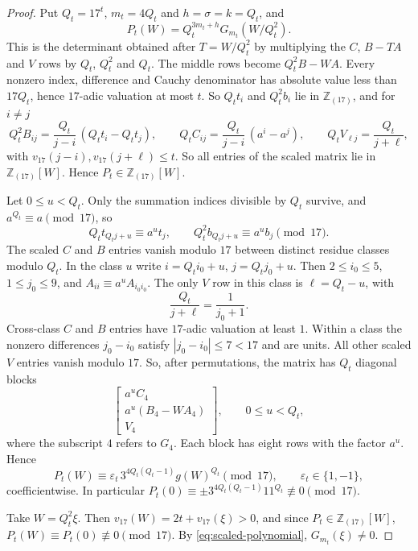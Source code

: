 \documentclass{amsart}
\numberwithin{equation}{section}
\numberwithin{table}{section}
\newcommand{\Z}{\mathbb{Z}}
\begin{document}
\begin{proof}
Put $Q_t=17^t$, $m_t=4Q_t$ and $h=\sigma=k=Q_t$, and
\begin{equation}\label{eq:scaled-polynomial}
P_t(W)=Q_t^{3m_t+h}G_{m_t}(W/Q_t^2).
\end{equation}
This is the determinant obtained after $T=W/Q_t^2$ by multiplying the $C$,
$B-TA$ and $V$ rows by $Q_t$, $Q_t^2$ and $Q_t$. The middle rows become
$Q_t^2B-WA$. Every nonzero index,
difference and Cauchy denominator has absolute value less than $17Q_t$,
hence $17$-adic valuation at most $t$. So $Q_tt_i$ and $Q_t^2b_i$ lie in
$\Z_{(17)}$, and for $i\ne j$
\[
 Q_t^2B_{ij}=\frac{Q_t}{j-i}\,(Q_tt_i-Q_tt_j),\qquad
 Q_tC_{ij}=\frac{Q_t}{j-i}\,(a^i-a^j),\qquad
 Q_tV_{\ell j}=\frac{Q_t}{j+\ell},
\]
with $v_{17}(j-i),v_{17}(j+\ell)\le t$. So all entries of the scaled matrix
lie in $\Z_{(17)}[W]$. Hence
$P_t\in\Z_{(17)}[W]$.

Let $0\le u<Q_t$. Only the summation indices divisible by $Q_t$
survive, and $a^{Q_t}\equiv a\pmod{17}$, so
\begin{equation*}
Q_t t_{Q_t j+u}\equiv a^ut_j,
\qquad Q_t^2b_{Q_t j+u}\equiv a^ub_j\pmod {17}.
\end{equation*}
The scaled $C$ and $B$ entries vanish modulo $17$ between distinct residue
classes modulo $Q_t$. In the class $u$ write $i=Q_t i_0+u$, $j=Q_t j_0+u$. Then
$2\le i_0\le5$, $1\le j_0\le9$, and $A_{ii}\equiv a^uA_{i_0i_0}$. The only $V$ row in this class is
$\ell=Q_t-u$, with
\[
\frac{Q_t}{j+\ell}=\frac{1}{j_0+1}.
\]
Cross-class $C$ and $B$ entries have $17$-adic valuation at least $1$.
Within a class the nonzero differences $j_0-i_0$ satisfy $|j_0-i_0|\le7<17$
and are units. All other scaled $V$ entries vanish modulo $17$. So, after permutations,
the matrix has $Q_t$ diagonal blocks
\[
\begin{bmatrix}
a^u C_4\\ a^u(B_4-WA_4)\\ V_4
\end{bmatrix},\qquad 0\le u<Q_t,
\]
where the subscript $4$ refers to $G_4$. Each block has eight rows with the
factor $a^u$. Hence
\begin{equation}\label{eq:block-congruence}
P_t(W)\equiv\varepsilon_t\,3^{4Q_t(Q_t-1)}g(W)^{Q_t}\pmod {17},
\qquad \varepsilon_t\in\{1,-1\},
\end{equation}
coefficientwise. In particular $P_t(0)\equiv\pm3^{4Q_t(Q_t-1)}11^{Q_t}\not\equiv0\pmod{17}$.

Take $W=Q_t^2\xi$. Then $v_{17}(W)=2t+v_{17}(\xi)>0$, and since
$P_t\in\Z_{(17)}[W]$, $P_t(W)\equiv P_t(0)\not\equiv0\pmod{17}$. By
\eqref{eq:scaled-polynomial}, $G_{m_t}(\xi)\ne0$.
\end{proof}
\end{document}
